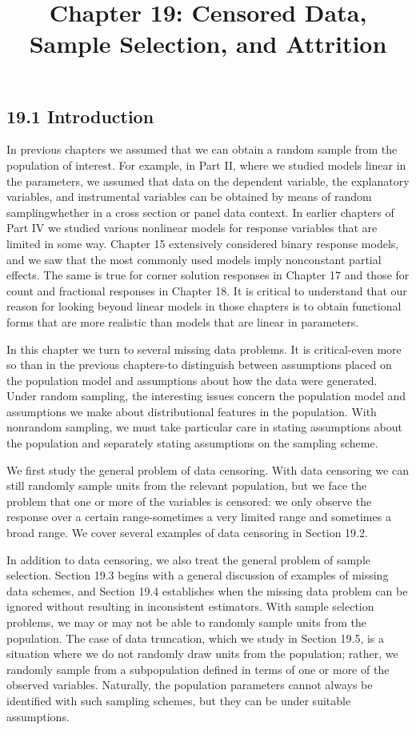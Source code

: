 \documentclass[10pt]{article}
\title{Chapter 19: Censored Data, Sample Selection, and Attrition}
\author{}
\date{}
\begin{document}
\maketitle

\subsection*{19.1 Introduction}
In previous chapters we assumed that we can obtain a random sample from the population of interest. For example, in Part II, where we studied models linear in the parameters, we assumed that data on the dependent variable, the explanatory variables, and instrumental variables can be obtained by means of random samplingwhether in a cross section or panel data context. In earlier chapters of Part IV we studied various nonlinear models for response variables that are limited in some way. Chapter 15 extensively considered binary response models, and we saw that the most commonly used models imply nonconstant partial effects. The same is true for corner solution responses in Chapter 17 and those for count and fractional responses in Chapter 18. It is critical to understand that our reason for looking beyond linear models in those chapters is to obtain functional forms that are more realistic than models that are linear in parameters.

In this chapter we turn to several missing data problems. It is critical-even more so than in the previous chapters-to distinguish between assumptions placed on the population model and assumptions about how the data were generated. Under random sampling, the interesting issues concern the population model and assumptions we make about distributional features in the population. With nonrandom sampling, we must take particular care in stating assumptions about the population and separately stating assumptions on the sampling scheme.

We first study the general problem of data censoring. With data censoring we can still randomly sample units from the relevant population, but we face the problem that one or more of the variables is censored: we only observe the response over a certain range-sometimes a very limited range and sometimes a broad range. We cover several examples of data censoring in Section 19.2.

In addition to data censoring, we also treat the general problem of sample selection. Section 19.3 begins with a general discussion of examples of missing data schemes, and Section 19.4 establishes when the missing data problem can be ignored without resulting in inconsistent estimators. With sample selection problems, we may or may not be able to randomly sample units from the population. The case of data truncation, which we study in Section 19.5, is a situation where we do not randomly draw units from the population; rather, we randomly sample from a subpopulation defined in terms of one or more of the observed variables. Naturally, the population parameters cannot always be identified with such sampling schemes, but they can be under suitable assumptions.
\end{document}
